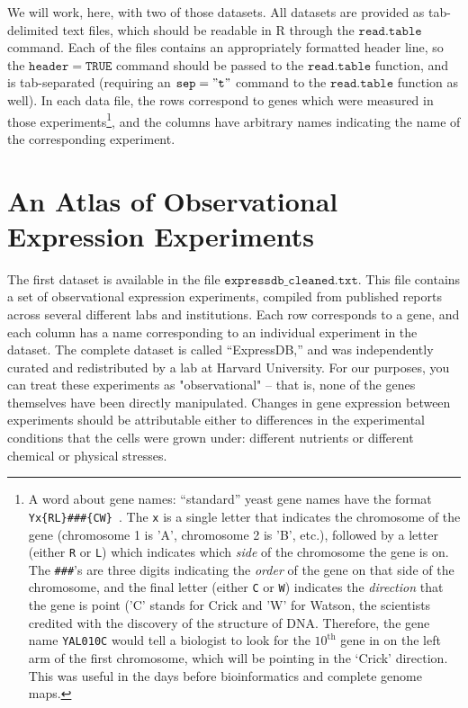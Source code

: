 \documentclass{article}
\newcommand{\rcode}[1]{\ensuremath{\mathtt{#1}}}
\begin{document}
We will work, here, with two of those datasets.  
All datasets are provided as tab-delimited text files, which should be readable in R through the \rcode{read.table} command.  
Each of the files contains an appropriately formatted header line, so the \rcode{header=TRUE} command should be passed to the \rcode{read.table} function, and is tab-separated (requiring an \rcode{sep="\\t"} command to the \rcode{read.table} function as well).  
In each data file, the rows correspond to genes which were measured in those experiments\footnote{A word about gene names: ``standard'' yeast gene names have the format \texttt{ Yx\{R\/L\}\#\#\#\{C\/W\} }.  The \texttt{x} is a single letter that indicates the chromosome of the gene (chromosome 1 is 'A', chromosome 2 is 'B', etc.), followed by a letter (either \texttt{R} or \texttt{L}) which indicates which \emph{side} of the chromosome the gene is on.  The \texttt{\#\#\#}'s are three digits indicating the \emph{order} of the gene on that side of the chromosome, and the final letter (either \texttt{C} or \texttt{W}) indicates the \emph{direction} that the gene is point ('C' stands for Crick and 'W' for Watson, the scientists credited with the discovery of the structure of DNA.  Therefore, the gene name \texttt{YAL010C} would tell a biologist to look for the $10^{\mathrm{th}}$ gene in on the left arm of the first chromosome, which will be pointing in the `Crick' direction.  This was useful in the days before bioinformatics and complete genome maps.}, and the columns have arbitrary names indicating the name of the corresponding experiment.  

\section{An Atlas of Observational Expression Experiments}

The first dataset is available in the file \rcode{expressdb\_cleaned.txt}.  
This file contains a set of observational expression experiments, compiled from published reports across several different labs and institutions.  
Each row corresponds to a gene, and each column has a name corresponding to an individual experiment in the dataset.
The complete dataset is called ``ExpressDB,'' and was independently curated and redistributed by a lab at Harvard University.  
For our purposes, you can treat these experiments as "observational" -- that is, none of the genes themselves have been directly manipulated.  
Changes in gene expression between experiments should be attributable either to differences in the experimental conditions that the cells were grown under: different nutrients or different chemical or physical stresses.  
\end{document}
